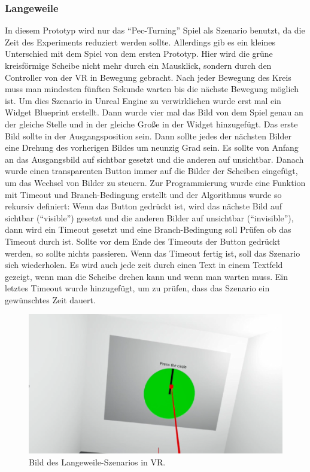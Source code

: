 \subsubsection{Langeweile} \label{langeweile-4}





In diesem Prototyp wird nur das ``Pec-Turning'' Spiel als Szenario benutzt, da die Zeit des Experiments reduziert werden sollte. Allerdings gib es ein kleines Unterschied mit dem Spiel von dem ersten Prototyp. 
Hier wird die grüne kreisförmige Scheibe nicht mehr durch ein Mausklick, sondern durch den Controller von der VR  in Bewegung gebracht. Nach jeder Bewegung des Kreis muss man mindesten fünften Sekunde warten bis die nächste Bewegung möglich ist.
Um dies Szenario in Unreal Engine zu verwirklichen wurde erst mal ein Widget Blueprint erstellt. 
Dann wurde vier mal das Bild von dem Spiel genau an der gleiche Stelle und in der gleiche Große in der Widget hinzugefügt. 
Das erste Bild sollte in der Ausgangsposition sein. 
Dann sollte jedes der nächsten Bilder eine Drehung des vorherigen Bildes um neunzig Grad sein. 
Es sollte von Anfang an das Ausgangsbild auf sichtbar gesetzt und die anderen auf unsichtbar. 
Danach wurde einen transparenten Button immer auf die Bilder der Scheiben eingefügt, um das Wechsel von Bilder zu steuern. 
Zur Programmierung wurde eine Funktion mit Timeout und Branch-Bedingung erstellt und der Algorithmus wurde so rekursiv definiert: 
Wenn das Button gedrückt ist, wird das nächste Bild auf sichtbar (``visible'') gesetzt und die anderen Bilder auf unsichtbar (``invisible''), dann wird ein Timeout gesetzt und eine Branch-Bedingung soll Prüfen ob das Timeout durch ist. Sollte vor dem Ende des Timeouts der Button gedrückt werden, so sollte nichts passieren. 
Wenn das Timeout fertig ist, soll das Szenario sich wiederholen. 
Es wird auch jede zeit durch einen Text in einem Textfeld gezeigt, wenn man die Scheibe drehen kann und wenn man warten muss. 
Ein letztes Timeout wurde hinzugefügt, um zu prüfen, dass das Szenario ein gewünschtes Zeit dauert.


\begin{figure}[H] \centering
\includegraphics[width=\textwidth]{Images/Boredom.png} 
\caption{ Bild des Langeweile-Szenarios in VR. }
\label{fig:boredom4} 
\end{figure}

